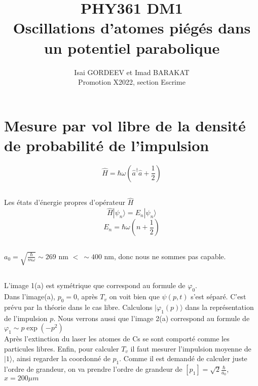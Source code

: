 \documentclass[a4paper,12pt]{article}
\title{PHY361 DM1 \\
 Oscillations d’atomes piégés dans un potentiel parabolique}
\author{Isai GORDEEV et Imad BARAKAT\\
Promotion X2022, section Escrime}
\begin{document}
\maketitle



\section{Mesure par vol libre de la densité de probabilité de l’impulsion}
$$\hat H =  \hbar\omega(\hat a^{\dagger }\hat a + \frac12)$$
\subsection{}
Les états d'énergie propres d'opérateur $\hat H$
\begin{equation}\label{key}
	\hat H |\psi_n\rangle = E_n |\psi_n\rangle
\end{equation}
$$E_n = \hbar\omega(n+\frac 1 2) $$

\subsection{}

$a_0 = \displaystyle\sqrt{\frac{\hbar}{m\omega}} \sim 269 $ nm $ <\ \sim400$ nm, donc nous ne sommes pas capable. 

\subsection{}

L'image 1(a) est symétrique que correspond au formule de $\varphi_0$.\\

Dans l'image(a), $p_0 = 0$, après $T_v$ on voit bien que $\psi(p, t)$ s'est séparé.
C'est prévu par la théorie dans le cas libre. Calculons $ |\varphi_1(p)\rangle$ dans la représentation de l'impulsion $p$. 
Nous verrons aussi que l'image 2(a) correspond au formule de $\varphi_1 \sim p\exp(-p^2)$ \\ 







Après l'extinction du laser les atomes de Cs se sont comporté comme les particules libres. 
Enfin, pour calculer $T_v$ il faut mesurer l'impulsion moyenne de $|1\rangle$, ainsi regarder la coordonné de $p_1$. Comme il est demandé de calculer juste l'ordre de grandeur, on va prendre l'ordre de grandeur de $[p_1] = \sqrt 2\frac{\hbar}{a_0}$, $x = 200\mu m$
\end{document}
